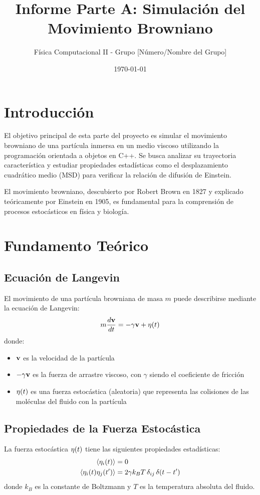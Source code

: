 \documentclass[11pt,a4paper]{article}
\title{Informe Parte A: Simulación del Movimiento Browniano}
\author{Física Computacional II - Grupo [Número/Nombre del Grupo]}
\date{\today}
\begin{document}
\maketitle
\tableofcontents
\newpage

\section{Introducción}
El objetivo principal de esta parte del proyecto es simular el movimiento browniano de una partícula inmersa en un medio viscoso utilizando la programación orientada a objetos en C++. Se busca analizar su trayectoria característica y estudiar propiedades estadísticas como el desplazamiento cuadrático medio (MSD) para verificar la relación de difusión de Einstein.

El movimiento browniano, descubierto por Robert Brown en 1827 y explicado teóricamente por Einstein en 1905, es fundamental para la comprensión de procesos estocásticos en física y biología.

\section{Fundamento Teórico}

\subsection{Ecuación de Langevin}
El movimiento de una partícula browniana de masa $m$ puede describirse mediante la ecuación de Langevin:
\begin{equation}
    m\frac{d\vb{v}}{dt} = -\gamma\vb{v} + \vb{\eta}(t)
    \label{eq:langevin}
\end{equation}
donde:
\begin{itemize}
    \item $\vb{v}$ es la velocidad de la partícula
    \item $-\gamma\vb{v}$ es la fuerza de arrastre viscoso, con $\gamma$ siendo el coeficiente de fricción
    \item $\vb{\eta}(t)$ es una fuerza estocástica (aleatoria) que representa las colisiones de las moléculas del fluido con la partícula
\end{itemize}

\subsection{Propiedades de la Fuerza Estocástica}
La fuerza estocástica $\vb{\eta}(t)$ tiene las siguientes propiedades estadísticas:
\begin{align}
    \expval{\eta_i(t)} &= 0 \\
    \expval{\eta_i(t)\eta_j(t')} &= 2\gamma k_B T\,\delta_{ij}\,\delta(t-t')
    \label{eq:fuerza_estocastica}
\end{align}
donde $k_B$ es la constante de Boltzmann y $T$ es la temperatura absoluta del fluido.
\end{document}
